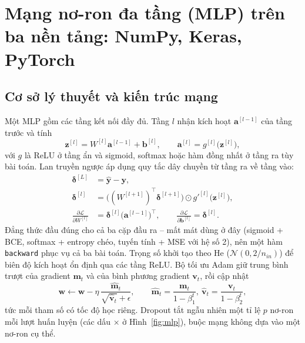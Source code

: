 \section{Mạng nơ-ron đa tầng (MLP) trên ba nền tảng: NumPy, Keras, PyTorch}

\subsection{Cơ sở lý thuyết và kiến trúc mạng}

Một MLP gồm các tầng kết nối đầy đủ. Tầng $l$ nhận kích hoạt $\mathbf{a}^{[l-1]}$ của tầng trước và tính
\begin{equation}
  \mathbf{z}^{[l]} = W^{[l]}\mathbf{a}^{[l-1]} + \mathbf{b}^{[l]}, \qquad \mathbf{a}^{[l]} = g^{[l]}\big(\mathbf{z}^{[l]}\big),
\end{equation}
với $g$ là ReLU ở tầng ẩn và sigmoid, softmax hoặc hàm đồng nhất ở tầng ra tùy bài toán. Lan truyền ngược áp dụng quy tắc
dây chuyền từ tầng ra về tầng vào:
\begin{align}
  \boldsymbol{\delta}^{[L]} &= \hat{\mathbf{y}} - \mathbf{y}, \\
  \boldsymbol{\delta}^{[l]} &= \big((W^{[l+1]})^\top\boldsymbol{\delta}^{[l+1]}\big) \odot g'^{[l]}\big(\mathbf{z}^{[l]}\big), \\
  \frac{\partial\mathcal{L}}{\partial W^{[l]}} &= \boldsymbol{\delta}^{[l]}\big(\mathbf{a}^{[l-1]}\big)^\top, \qquad
  \frac{\partial\mathcal{L}}{\partial\mathbf{b}^{[l]}} = \boldsymbol{\delta}^{[l]} .
\end{align}
Đẳng thức đầu đúng cho cả ba cặp đầu ra -- mất mát dùng ở đây (sigmoid + BCE, softmax + entropy chéo, tuyến tính + MSE
với hệ số 2), nên một hàm \texttt{backward} phục vụ cả ba bài toán. Trọng số khởi tạo theo He \cite{he2015init}
($\mathcal{N}(0, 2/n_{in})$) để biên độ kích hoạt ổn định qua các tầng ReLU. Bộ tối ưu Adam \cite{kingma2015} giữ trung bình
trượt của gradient $\mathbf{m}_t$ và của bình phương gradient $\mathbf{v}_t$, rồi cập nhật
\begin{equation}
  \mathbf{w} \leftarrow \mathbf{w} - \eta\,\frac{\hat{\mathbf{m}}_t}{\sqrt{\hat{\mathbf{v}}_t} + \epsilon},
  \qquad \hat{\mathbf{m}}_t = \frac{\mathbf{m}_t}{1 - \beta_1^t},\ \hat{\mathbf{v}}_t = \frac{\mathbf{v}_t}{1 - \beta_2^t},
\end{equation}
tức mỗi tham số có tốc độ học riêng. Dropout \cite{srivastava2014} tắt ngẫu nhiên một tỉ lệ $p$ nơ-ron mỗi lượt huấn luyện
(các dấu × ở Hình~\ref{fig:mlp}), buộc mạng không dựa vào một nơ-ron cụ thể.

